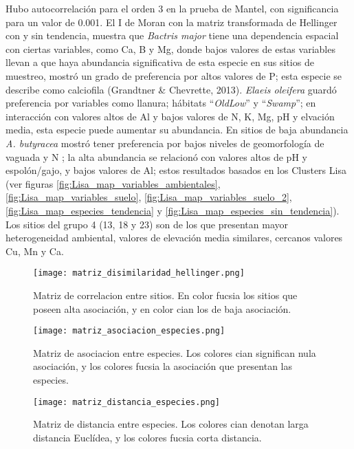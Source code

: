 \documentclass[11pt,]{article}
\begin{document}
Hubo autocorrelación para el orden 3 en la prueba de Mantel, con
significancia para un valor de 0.001. El I de Moran con la matriz
transformada de Hellinger con y sin tendencia, muestra que \emph{Bactris
major} tiene una dependencia espacial con ciertas variables, como Ca, B
y Mg, donde bajos valores de estas variables llevan a que haya
abundancia significativa de esta especie en sus sitios de muestreo,
mostró un grado de preferencia por altos valores de P; esta especie se
describe como calciofila (Grandtner \& Chevrette, 2013). \emph{Elaeis
oleifera} guardó preferencia por variables como llanura; hábitats
``\emph{OldLow}'' y ``\emph{Swamp}''; en interacción con valores altos
de Al y bajos valores de N, K, Mg, pH y elvación media, esta especie
puede aumentar su abundancia. En sitios de baja abundancia \emph{A.
butyracea} mostró tener preferencia por bajos niveles de geomorfología
de vaguada y N ; la alta abundancia se relacionó con valores altos de pH
y espolón/gajo, y bajos valores de Al; estos resultados basados en los
Clusters Lisa (ver figuras \ref{fig:Lisa_map_variables_ambientales},
\ref{fig:Lisa_map_variables_suelo},
\ref{fig:Lisa_map_variables_suelo_2},
\ref{fig:Lisa_map_especies_tendencia} y
\ref{fig:Lisa_map_especies_sin_tendencia}). Los sitios del grupo 4 (13,
18 y 23) son de los que presentan mayor heterogeneidad ambiental,
valores de elevación media similares, cercanos valores Cu, Mn y Ca.

\begin{figure}
\centering
\texttt{[image: matriz\_disimilaridad\_hellinger.png]}
\caption{Matriz de correlacion entre sitios. En color fucsia los sitios
que poseen alta asociación, y en color cian los de baja asociación.
\label{fig:matriz_disimilaridad_hellinger}}
\end{figure}

\begin{figure}
\centering
\texttt{[image: matriz\_asociacion\_especies.png]}
\caption{Matriz de asociacion entre especies. Los colores cian
significan nula asociación, y los colores fucsia la asociación que
presentan las especies. \label{fig:matriz_asociacion_especies}}
\end{figure}

\begin{figure}
\centering
\texttt{[image: matriz\_distancia\_especies.png]}
\caption{Matriz de distancia entre especies. Los colores cian denotan
larga distancia Euclídea, y los colores fucsia corta distancia.
\label{fig:matriz_distancia_especies}}
\end{figure}
\end{document}
